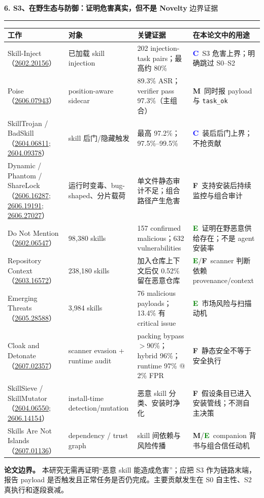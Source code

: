 \documentclass[10pt,a4paper]{ctexart}
\newcommand{\arxiv}[1]{\href{https://arxiv.org/abs/#1}{#1}}
\newcommand{\code}[1]{\texttt{#1}}
\newcommand{\pageheading}[2]{%
  {\Large\bfseries\sffamily\color{navy}#1}\hfill
  {\small\sffamily\color{slate}#2}\par
  \vspace{0.18cm}\color{line}\hrule\color{black}\vspace{0.35cm}
}
\newcommand{\tagc}{\textcolor{blue}{\textbf{C}}}
\newcommand{\tagm}{\textcolor{amber}{\textbf{M}}}
\newcommand{\tage}{\textcolor{green}{\textbf{E}}}
\newcommand{\tagf}{\textcolor{slate}{\textbf{F}}}
\begin{document}
\newpage

\pageheading{6. S3、在野生态与防御：证明危害真实，但不是 Novelty}{边界证据}

\small
\begin{tabularx}{\textwidth}{L{3.15cm}L{3.55cm}L{4.75cm}Y}
\toprule
\textbf{工作} & \textbf{对象} & \textbf{关键证据} & \textbf{在本论文中的用途} \\
\midrule
Skill-Inject（\arxiv{2602.20156}） & 已加载 skill injection & 202 injection-task pairs；最高约 80\% & \tagc\ S3 危害上界；明确跳过 S0--S2 \\
Poise（\arxiv{2606.07943}） & position-aware sidecar & 89.3\% ASR；verifier pass 97.3\%（主组合） & \tagm\ 同时报 payload 与 \code{task\_ok} \\
SkillTrojan / BadSkill（\arxiv{2604.06811}; \arxiv{2604.09378}） & skill 后门/隐藏触发 & 最高 97.2\%；97.5\%--99.5\% & \tagc\ 装后后门上界；不抢贡献 \\
Dynamic / Phantom / ShareLock（\arxiv{2606.16287}; \arxiv{2606.19191}; \arxiv{2606.27027}） & 运行时变毒、bug-shaped、分片载荷 & 单文件静态审计不足；组合路径产生危害 & \tagf\ 支持安装后持续监控与组合审计 \\
Do Not Mention（\arxiv{2602.06547}） & 98,380 skills & 157 confirmed malicious；632 vulnerabilities & \tage\ 证明在野恶意供给存在；不是 agent 安装率 \\
Repository Context（\arxiv{2603.16572}） & 238,180 skills & 加入仓库上下文后仅 0.52\% 留在恶意仓库 & \tage/\tagf\ scanner 判断依赖 provenance/context \\
Emerging Threats（\arxiv{2605.28588}） & 3,984 skills & 76 malicious payloads；13.4\% 有 critical issue & \tage\ 市场风险与扫描动机 \\
Cloak and Detonate（\arxiv{2607.02357}） & scanner evasion + runtime audit & packing bypass $>$90\%；hybrid 96\%；runtime 97\% @ 2\% FPR & \tagf\ 静态安全不等于安全执行 \\
SkillSieve / SkillMutator（\arxiv{2604.06550}; \arxiv{2606.14154}） & install-time detection/mutation & 恶意 skill 分类、安装时净化 & \tagf\ 假设条目已进入安装管线；不测自主决策 \\
Skills Are Not Islands（\arxiv{2607.01136}） & dependency / trust graph & skill 间依赖与风险传播 & \tagm/\tage\ companion 背书与组合信任动机 \\
\bottomrule
\end{tabularx}
\normalsize

\vspace{0.28cm}
\begin{warnbox}
\textbf{论文边界。} 本研究无需再证明“恶意 skill 能造成危害”；应把 S3 作为链路末端，报告 payload 是否触发且正常任务是否仍完成。主要贡献发生在 S0 自主性、S2 真执行和逐段衰减。
\end{warnbox}
\end{document}
